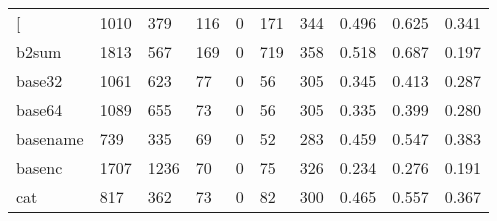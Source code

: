 \begin{longtable}{lp{2.0cm}p{2.0cm}p{2.0cm}p{2.0cm}p{2.0cm}p{2.0cm}p{2.0cm}p{2.0cm}p{2.0cm}}
\bottomrule
\endlastfoot
{[}         &                   1010 &                                379 &                               116 &                                0 &                               171 &                             344 &                                0.496 &                                  0.625 &                                0.341 \\
b2sum     &                   1813 &                                567 &                               169 &                                0 &                               719 &                             358 &                                0.518 &                                  0.687 &                                0.197 \\
base32    &                   1061 &                                623 &                                77 &                                0 &                                56 &                             305 &                                0.345 &                                  0.413 &                                0.287 \\
base64    &                   1089 &                                655 &                                73 &                                0 &                                56 &                             305 &                                0.335 &                                  0.399 &                                0.280 \\
basename  &                    739 &                                335 &                                69 &                                0 &                                52 &                             283 &                                0.459 &                                  0.547 &                                0.383 \\
basenc    &                   1707 &                               1236 &                                70 &                                0 &                                75 &                             326 &                                0.234 &                                  0.276 &                                0.191 \\
cat       &                    817 &                                362 &                                73 &                                0 &                                82 &                             300 &                                0.465 &                                  0.557 &                                0.367 \\

\end{longtable}
